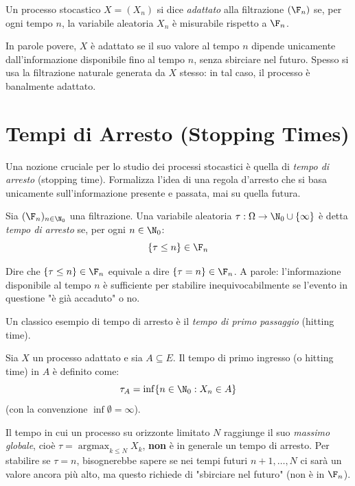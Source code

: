 \begin{definition}
Un processo stocastico $X = (X_n)$ si dice \emph{adattato} alla filtrazione $(\F_n)$ se, per ogni tempo $n$, la variabile aleatoria $X_n$ è misurabile rispetto a $\F_n$.
\end{definition}

In parole povere, $X$ è adattato se il suo valore al tempo $n$ dipende unicamente dall'informazione disponibile fino al tempo $n$, senza sbirciare nel futuro. 
Spesso si usa la filtrazione naturale generata da $X$ stesso: in tal caso, il processo è banalmente adattato.

\section{Tempi di Arresto (Stopping Times)}

Una nozione cruciale per lo studio dei processi stocastici è quella di \emph{tempo di arresto} (stopping time). Formalizza l'idea di una regola d'arresto che si basa unicamente sull'informazione presente e passata, mai su quella futura.

\begin{definition}
Sia $(\F_n)_{n \in \N_0}$ una filtrazione. Una variabile aleatoria $\tau : \Omega \to \N_0 \cup \{\infty\}$ è detta \emph{tempo di arresto} se, per ogni $n \in \N_0$:
\[ \{\tau \le n\} \in \F_n \]
\end{definition}

\begin{hint}
Dire che $\{\tau \le n\} \in \F_n$ equivale a dire $\{\tau = n\} \in \F_n$.
A parole: l'informazione disponibile al tempo $n$ è sufficiente per stabilire inequivocabilmente se l'evento in questione "è già accaduto" o no.
\end{hint}

Un classico esempio di tempo di arresto è il \emph{tempo di primo passaggio} (hitting time).

\begin{definition}
Sia $X$ un processo adattato e sia $A \subseteq E$. Il tempo di primo ingresso (o hitting time) in $A$ è definito come:
\[ \tau_A = \inf\{n \in \N_0 : X_n \in A\} \]
(con la convenzione $\inf \emptyset = \infty$).
\end{definition}

\begin{esempio}
Il tempo in cui un processo su orizzonte limitato $N$ raggiunge il suo \emph{massimo globale}, cioè $\tau = \operatorname{argmax}_{k \le N} X_k$, \textbf{non} è in generale un tempo di arresto. Per stabilire se $\tau = n$, bisognerebbe sapere se nei tempi futuri $n+1, \dots, N$ ci sarà un valore ancora più alto, ma questo richiede di "sbirciare nel futuro" (non è in $\F_n$).
\end{esempio}

